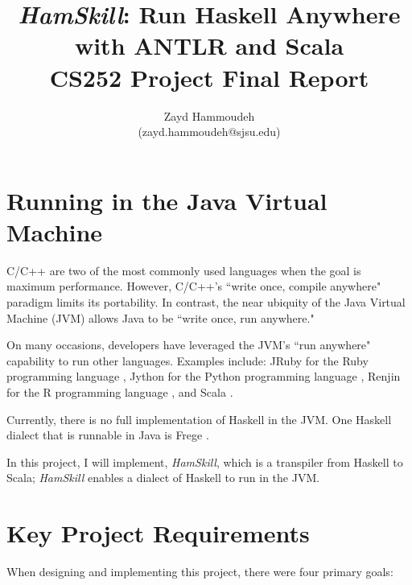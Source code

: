 \documentclass{report}
\title{\emph{HamSkill}: Run Haskell Anywhere \\
with ANTLR and Scala\\[1in]
	   CS252 Project Final Report}
\author{
  Zayd Hammoudeh \\
  (zayd.hammoudeh@sjsu.edu)
  }
\begin{document}
\maketitle

\tableofcontents{\protect\newpage}

\renewcommand\thesection{\arabic{section}}
\section{Running in the Java Virtual Machine}\label{sec:jvm}

C/C++ are two of the most commonly used languages when the goal is maximum performance.  However, C/C++'s ``write once, compile anywhere" paradigm limits its portability.  In contrast, the near ubiquity of the Java Virtual Machine (JVM) allows Java to be ``write once, run anywhere."  

On many occasions, developers have leveraged the JVM's ``run anywhere" capability to run other languages.  Examples include: JRuby for the Ruby programming language \cite{jruby}, Jython for the Python programming language \cite{jython_jvm}, Renjin for the R programming language \cite{renjin}, and Scala \cite{scala}.

Currently, there is no full implementation of Haskell in the JVM.  One Haskell dialect that is runnable in Java is Frege \cite{frege}.  

In this project, I will implement, \emph{HamSkill}, which is a transpiler from Haskell to Scala; \emph{HamSkill} enables a dialect of Haskell to run in the JVM.  

\section{Key Project Requirements}\label{sec:keyProjectRequirements}

When designing and implementing this project, there were four primary goals:
\end{document}
